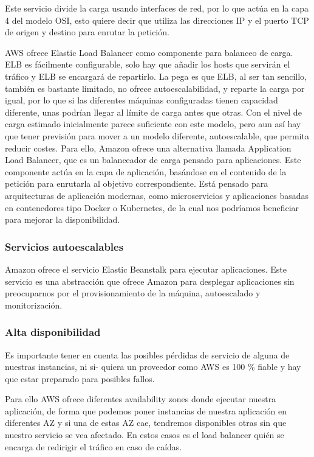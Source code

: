 \documentclass[12pt,a4paperpaper,]{report}
\begin{document}
Este servicio divide la carga usando interfaces de red, por lo que actúa
en la capa 4 del modelo OSI, esto quiere decir que utiliza las
direcciones IP y el puerto TCP de origen y destino para enrutar la
petición.

AWS ofrece Elastic Load Balancer como componente para balanceo de carga.
ELB es fácilmente configurable, solo hay que añadir los hosts que
servirán el tráfico y ELB se encargará de repartirlo. La pega es que
ELB, al ser tan sencillo, también es bastante limitado, no ofrece
autoescalabilidad, y reparte la carga por igual, por lo que si las
diferentes máquinas configuradas tienen capacidad diferente, unas
podrían llegar al límite de carga antes que otras. Con el nivel de carga
estimado inicialmente parece suficiente con este modelo, pero aun así
hay que tener previsión para mover a un modelo diferente, autoescalable,
que permita reducir costes. Para ello, Amazon ofrece una alternativa
llamada Application Load Balancer, que es un balanceador de carga
pensado para aplicaciones. Este componente actúa en la capa de
aplicación, basándose en el contenido de la petición para enrutarla al
objetivo correspondiente. Está pensado para arquitecturas de aplicación
modernas, como microservicios y aplicaciones basadas en contenedores
tipo Docker o Kubernetes, de la cual nos podríamos beneficiar para
mejorar la disponibilidad.

\subsubsection{Servicios autoescalables}\label{servicios-autoescalables}

Amazon ofrece el servicio Elastic Beanstalk para ejecutar aplicaciones.
Este servicio es una abstracción que ofrece Amazon para desplegar
aplicaciones sin preocuparnos por el provisionamiento de la máquina,
autoescalado y monitorización.

\subsubsection{Alta disponibilidad}\label{alta-disponibilidad}

Es importante tener en cuenta las posibles pérdidas de servicio de
alguna de nuestras instancias, ni si- quiera un proveedor como AWS es
100 \% fiable y hay que estar preparado para posibles fallos.

Para ello AWS ofrece diferentes availability zones donde ejecutar
nuestra aplicación, de forma que podemos poner instancias de nuestra
aplicación en diferentes AZ y si una de estas AZ cae, tendremos
disponibles otras sin que nuestro servicio se vea afectado. En estos
casos es el load balancer quién se encarga de redirigir el tráfico en
caso de caídas.
\end{document}
